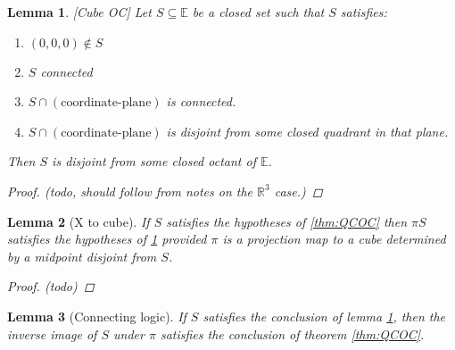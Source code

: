 \documentclass{article}
\theoremstyle{mystyle}
\newtheorem{lem}{Lemma}[section]
\theoremstyle{remark}
\begin{document}
\begin{lem}
	\label{lem:cubeOC}
	[Cube OC] Let \(S \subseteq \mathbb{E}  \) be a closed set such that \(S\) satisfies: 
	\begin{enumerate}
		\item \((0,0,0) \not\in S\) 
		\item \(S\) connected
		\item \(S \cap (\text{coordinate-plane})\) is connected.
		\item \(S \cap (\text{coordinate-plane})\) is disjoint from some closed quadrant in that plane.
	\end{enumerate}
	Then \(S\) is disjoint from some closed octant of \(\mathbb{E}\). 
	\begin{proof}
		(todo, should follow from notes on the \(\mathbb{R}^{3}\) case.)
	\end{proof}
\end{lem}

\begin{lem}
	[\label{lem:Xtocube}X to cube]
	If \(S\) satisfies the hypotheses of \ref{thm:QCOC} then \(\pi S\) satisfies the hypotheses of \ref{lem:cubeOC} provided \(\pi\) is a projection map to a cube determined by a midpoint disjoint from \(S\).
\begin{proof}
	(todo)	
\end{proof}
\end{lem}

\begin{lem}
	[Connecting logic]
	If \(S\) satisfies the conclusion of lemma \ref{lem:cubeOC}, then the inverse image of \(S\) under \(\pi\) satisfies the conclusion of theorem \ref{thm:QCOC}.
\end{lem}
\end{document}
